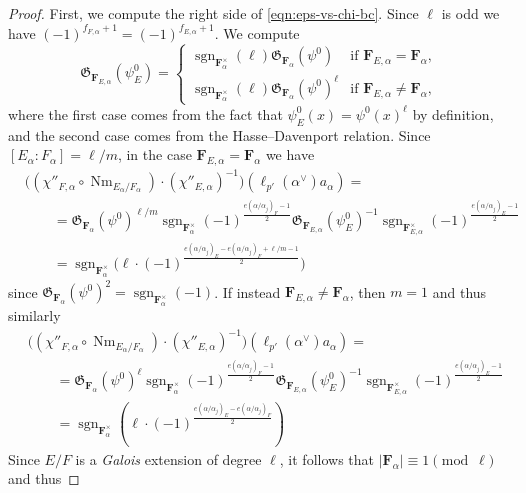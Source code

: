 \documentclass[reqno]{amsart}
\numberwithin{equation}{subsection}
\newcommand{\F}{\mathbf{F}}
\newcommand{\sgn}{\operatorname{sgn}}
\newcommand\frG{\mathfrak{G}}
\DeclareMathOperator{\Nm}{Nm}
\theoremstyle{remark}
\numberwithin{equation}{subsection}
\numberwithin{figure}{subsection}
\begin{document}
\begin{proof}
First, we compute the right side of \eqref{eqn:eps-vs-chi-bc}. Since $\ell$ is odd we have $(-1)^{f_{F,\alpha}+1} = (-1)^{f_{E,\alpha}+1}$. We compute
\[
\frG_{\F_{E,\alpha}}(\psi_E^0) = \begin{cases}
    \sgn_{\F_\alpha^\times}(\ell)\frG_{\F_\alpha}(\psi^0) &\text{if } \F_{E,\alpha} = \F_\alpha, \\
    \sgn_{\F_\alpha^\times}(\ell) \frG_{\F_\alpha}(\psi^0)^\ell &\text{if } \F_{E,\alpha} \neq \F_\alpha,
\end{cases}
\]
where the first case comes from the fact that $\psi^0_E(x) = \psi^0(x)^\ell$ by definition, and the second case comes from the Hasse--Davenport relation. Since $[E_\alpha:F_\alpha]=\ell/m$, in the case $\F_{E,\alpha} = \F_\alpha$ we have
\begin{equation}
\begin{aligned}
&\bigl((\chi''_{F,\alpha} \circ \Nm_{E_\alpha/F_\alpha}) \cdot (\chi''_{E,\alpha})^{-1}\bigr)(\ell_{p'}(\alpha^\vee)a_\alpha) = \\
    &\qquad= \frG_{\F_\alpha}(\psi^0)^{\ell/m} \sgn_{\F_\alpha^\times}(-1)^{\frac{e(\alpha/\alpha_j)_F-1}{2}}\frG_{\F_{E,\alpha}}(\psi^0_E)^{-1} \sgn_{\F_{E,\alpha}^\times}(-1)^{\frac{e(\alpha/\alpha_j)_E-1}{2}} \\
    &\qquad= \sgn_{\F_\alpha^\times}\bigl(\ell \cdot (-1)^{\frac{e(\alpha/\alpha_j)_E - e(\alpha/\alpha_j)_F + \ell/m - 1}{2}}\bigr)\label{eqn:chi-calc-ram-bc}
\end{aligned}
\end{equation}
since $\frG_{\F_\alpha}(\psi^0)^2 = \sgn_{\F_\alpha^\times}(-1)$. If instead  $\F_{E,\alpha} \neq \F_\alpha$, then $m = 1$ and thus similarly
\begin{equation}
\begin{aligned}
&\bigl((\chi''_{F,\alpha} \circ \Nm_{E_\alpha/F_\alpha}) \cdot (\chi''_{E,\alpha})^{-1}\bigr)(\ell_{p'}(\alpha^\vee)a_\alpha) = \\
    &\qquad= \frG_{\F_\alpha}(\psi^0)^\ell \sgn_{\F_\alpha^\times}(-1)^{\frac{e(\alpha/\alpha_j)_F-1}{2}}\frG_{\F_{E,\alpha}}(\psi^0_E)^{-1} \sgn_{\F_{E,\alpha}^\times}(-1)^{\frac{e(\alpha/\alpha_j)_E-1}{2}} \\
    &\qquad= \sgn_{\F_\alpha^\times}(\ell \cdot (-1)^{\frac{e(\alpha/\alpha_j)_E - e(\alpha/\alpha_j)_F }{2}})\label{eqn:chi-calc-unram-bc}
\end{aligned}
\end{equation}
Since $E/F$ is a \emph{Galois} extension of degree $\ell$, it follows that $|\F_\alpha| \equiv 1 \pmod{\ell}$ and thus 

\end{proof}
\end{document}
